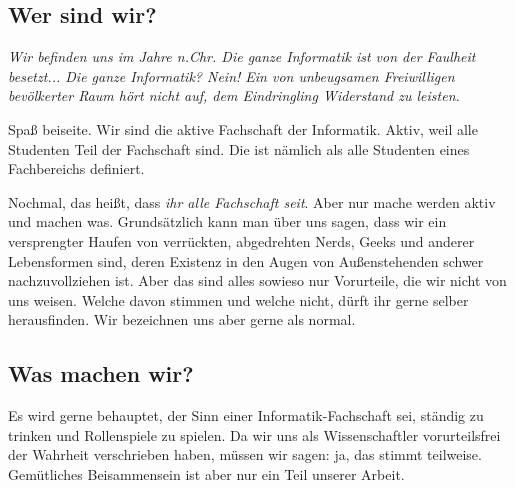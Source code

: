 
\subsection{Wer sind wir?}
    \glqq\textit{Wir befinden uns im Jahre \the\year{} n.Chr. Die ganze Informatik ist von der Faulheit besetzt... Die ganze Informatik? Nein! Ein von unbeugsamen Freiwilligen bevölkerter Raum hört nicht auf, dem Eindringling  Widerstand zu leisten.} \grqq

    Spaß beiseite. Wir sind die aktive Fachschaft der Informatik. Aktiv, weil alle Studenten Teil der Fachschaft sind. Die ist n\"amlich als alle Studenten eines Fachbereichs definiert.

    Nochmal, das hei{\ss}t, dass \emph{ihr alle Fachschaft seit}. Aber nur mache werden aktiv und machen was. %
    Grundsätzlich kann man über uns sagen, dass wir ein versprengter Haufen von verrückten, abgedrehten Nerds, Geeks und anderer Lebensformen sind, deren Existenz in den Augen von Außenstehenden schwer nachzuvollziehen ist.
    Aber das sind alles sowieso nur Vorurteile, die wir nicht von uns weisen. Welche davon stimmen und welche nicht, dürft ihr gerne selber herausfinden. Wir bezeichnen uns aber gerne als normal.



\subsection{Was machen wir?}
    Es wird gerne behauptet, der Sinn einer Informatik-Fachschaft sei, st\"andig zu trinken und Rollenspiele zu spielen.
    Da wir uns als Wissenschaftler vorurteilsfrei der Wahrheit verschrieben haben, m\"ussen wir sagen: ja, das stimmt teilweise.
    Gem\"utliches Beisammensein ist aber nur ein Teil unserer Arbeit.

